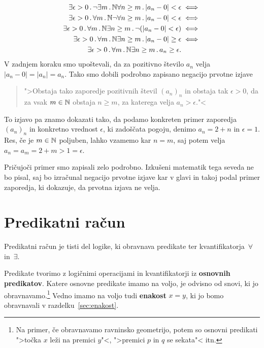 \begin{zgled}
\begin{align*}
    \exists \epsilon > 0 \,.\, \lnot \exists m \,.\,{\mathbb{N}} \forall n \geq m \,.\,
          |a_n - 0| < \epsilon &\iff
    \\
    \exists \epsilon > 0 \,.\, \forall m \,.\,{\mathbb{N}} \lnot \forall n \geq m \,.\,
          |a_n - 0| < \epsilon &\iff
    \\
    \exists \epsilon > 0 \,.\, \forall m \,.\,{\mathbb{N}} \exists n \geq m \,.\,
          \lnot (|a_n - 0| < \epsilon) &\iff
    \\
    \exists \epsilon > 0 \,.\, \forall m \,.\,{\mathbb{N}} \exists n \geq m \,.\,
          |a_n - 0| \geq \epsilon &\iff
    \\
    \exists \epsilon > 0 \,.\, \forall m \,.\,{\mathbb{N}} \exists n \geq m \,.\,
          a_n \geq \epsilon.
  \end{align*}
  V zadnjem koraku smo upoštevali, da za pozitivno število $a_n$ velja
  $|a_n - 0| = |a_n| = a_n$. Tako smo dobili podrobno zapisano
  negacijo prvotne izjave
  \begin{quote}
    ">Obstaja tako zaporedje pozitivnih števil $(a_n)_n$ in obstaja
    tak $\epsilon > 0$, da za vsak $m \in \mathbb{N}$ obstaja $n \geq m$, za
    katerega velja $a_n > \epsilon$."<
  \end{quote}
  To izjavo pa znamo dokazati tako, da podamo konkreten primer
  zaporedja $(a_n)_n$ in konkretno vrednost $\epsilon$, ki zadoščata
  pogoju, denimo $a_n = 2 + n$ in $\epsilon = 1$. Res, če je $m \in
  \mathbb{N}$ poljuben, lahko vzamemo kar $n = m$, saj potem velja $a_n = a_m
  = 2 + m > 1 = \epsilon$.

  Pričujoči primer smo zapisali zelo podrobno. Izkušeni matematik tega
  seveda ne bo pisal, saj bo izračunal negacijo prvotne izjave kar v
  glavi in takoj podal primer zaporedja, ki dokazuje, da prvotna
  izjava ne velja.
\end{zgled}

\section{Predikatni račun}
\label{sec:predikatni-racun}

Predikatni račun je tisti del logike, ki obravnava predikate ter
kvantifikatorja~$\forall$ in~$\exists$.

Predikate tvorimo z logičnimi operacijami in kvantifikatorji iz
\textbf{osnovnih predikatov}. Katere osnovne predikate imamo na voljo,
je odvisno od snovi, ki jo obravnavamo.\footnote{Na primer, če
  obravnavamo ravninsko geometrijo, potem so osnovni predikati ">točka
  $x$ leži na premici $y$"<, ">premici $p$ in $q$ se sekata"< itn.}
Vedno imamo na voljo tudi \textbf{enakost} $x = y$, ki jo bomo
obravnavali v razdelku~\ref{sec:enakost}.


